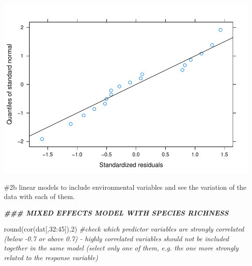\documentclass[
]{article}
\newenvironment{Shaded}{\begin{snugshade}}{\end{snugshade}}
\newcommand{\CommentTok}[1]{\textcolor[rgb]{0.56,0.35,0.01}{\textit{#1}}}
\newcommand{\DecValTok}[1]{\textcolor[rgb]{0.00,0.00,0.81}{#1}}
\newcommand{\DocumentationTok}[1]{\textcolor[rgb]{0.56,0.35,0.01}{\textbf{\textit{#1}}}}
\newcommand{\FunctionTok}[1]{\textcolor[rgb]{0.00,0.00,0.00}{#1}}
\newcommand{\NormalTok}[1]{#1}
\newcommand{\SpecialCharTok}[1]{\textcolor[rgb]{0.00,0.00,0.00}{#1}}
\begin{document}
\includegraphics{birdsdataanalysis_files/figure-latex/unnamed-chunk-7-2.pdf}

\#2b linear models to include environmental variables and see the
variation of the data with each of them.

\begin{Shaded}
\begin{Highlighting}[]
\DocumentationTok{\#\#\# MIXED EFFECTS MODEL WITH SPECIES RICHNESS}

\FunctionTok{round}\NormalTok{(}\FunctionTok{cor}\NormalTok{(dat[,}\DecValTok{32}\SpecialCharTok{:}\DecValTok{45}\NormalTok{]),}\DecValTok{2}\NormalTok{) }\CommentTok{\#check which predictor variables are strongly correlated (below {-}0.7 or above 0.7) {-} highly correlated variables should not be included together in the same model (select only one of them, e.g. the one more strongly related to the response variable)}
\end{Highlighting}
\end{Shaded}
\end{document}
